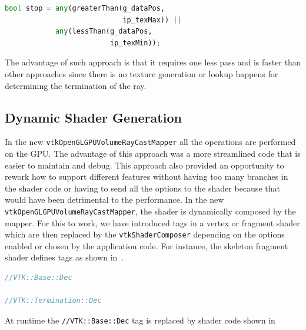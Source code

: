\begin{center}
  \begin{lstlisting}[language=Python, caption={Ray stop determination},
                     captionpos=b, frame=single, breaklines=true]
bool stop = any(greaterThan(g_dataPos,
                            ip_texMax)) ||
            any(lessThan(g_dataPos,
                         ip_texMin));
  \end{lstlisting}
\end{center}

The advantage of such approach is that it requires one less pass and is faster
than other approaches since there is no texture generation or lookup happens
for determining the termination of the ray.


\subsection{Dynamic Shader Generation}
In the new \texttt{vtkOpenGLGPUVolumeRayCastMapper} all the operations are
performed on the GPU. The advantage of this approach was a more streamlined code
that is easier to maintain and debug. This approach also provided an opportunity
to rework how to support different features without having too many branches in
the shader code or having to send all the options to the shader because that
would have been detrimental to the performance. In the new
\texttt{vtkOpenGLGPUVolumeRayCastMapper}, the shader is dynamically composed by
the mapper. For this to work, we have introduced tags in a vertex or fragment
shader which are then replaced by the \texttt{vtkShaderComposer} depending on
the options enabled or chosen by the application code. For instance, the
skeleton fragment shader defines tags as shown in~.

\begin{lstlisting}[language=C++, caption={Fragment shader tags},
                   captionpos=b, frame=single, breaklines=true,
                   label=lst:skeletonshader]
//VTK::Base::Dec

//VTK::Termination::Dec

\end{lstlisting}

At runtime the \texttt{//VTK::Base::Dec} tag is replaced by shader code
shown in~

